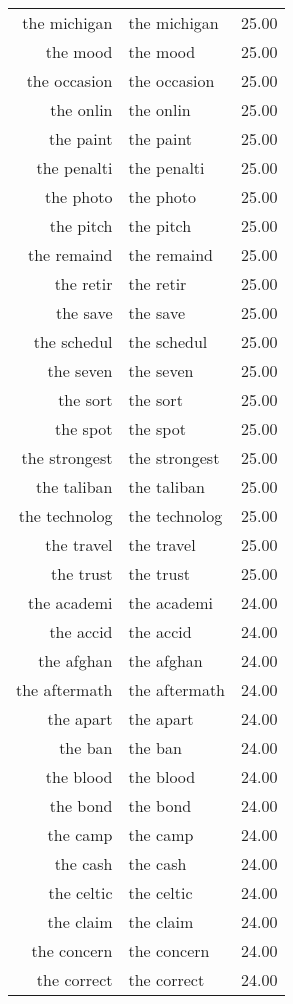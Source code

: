 \begin{table}[ht]
\begin{tabular}{rlr}
  the michigan & the michigan & 25.00 \\ 
  the mood & the mood & 25.00 \\ 
  the occasion & the occasion & 25.00 \\ 
  the onlin & the onlin & 25.00 \\ 
  the paint & the paint & 25.00 \\ 
  the penalti & the penalti & 25.00 \\ 
  the photo & the photo & 25.00 \\ 
  the pitch & the pitch & 25.00 \\ 
  the remaind & the remaind & 25.00 \\ 
  the retir & the retir & 25.00 \\ 
  the save & the save & 25.00 \\ 
  the schedul & the schedul & 25.00 \\ 
  the seven & the seven & 25.00 \\ 
  the sort & the sort & 25.00 \\ 
  the spot & the spot & 25.00 \\ 
  the strongest & the strongest & 25.00 \\ 
  the taliban & the taliban & 25.00 \\ 
  the technolog & the technolog & 25.00 \\ 
  the travel & the travel & 25.00 \\ 
  the trust & the trust & 25.00 \\ 
  the academi & the academi & 24.00 \\ 
  the accid & the accid & 24.00 \\ 
  the afghan & the afghan & 24.00 \\ 
  the aftermath & the aftermath & 24.00 \\ 
  the apart & the apart & 24.00 \\ 
  the ban & the ban & 24.00 \\ 
  the blood & the blood & 24.00 \\ 
  the bond & the bond & 24.00 \\ 
  the camp & the camp & 24.00 \\ 
  the cash & the cash & 24.00 \\ 
  the celtic & the celtic & 24.00 \\ 
  the claim & the claim & 24.00 \\ 
  the concern & the concern & 24.00 \\ 
  the correct & the correct & 24.00 \\ 

\end{tabular}
\end{table}
